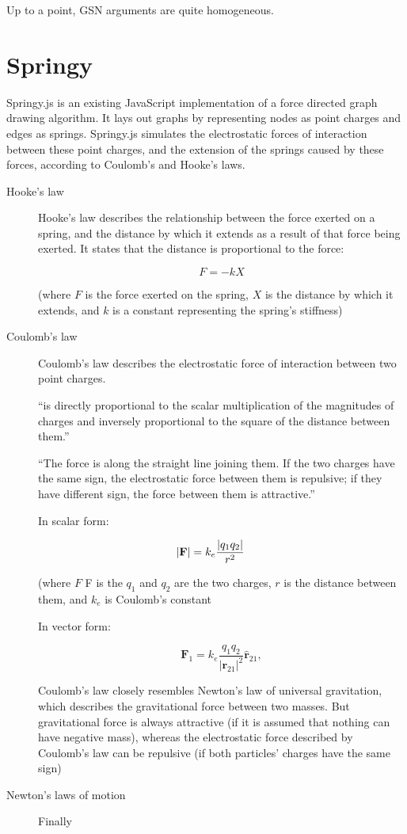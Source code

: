 Up to a point, GSN arguments are quite homogeneous. 


\section{Springy}

Springy.js is an existing JavaScript implementation of a force directed graph drawing algorithm.
It lays out graphs by representing nodes as point charges and edges as springs. Springy.js simulates the electrostatic forces of interaction between these point charges, and the extension of the springs caused by these forces, according to Coulomb's and Hooke's laws.



\begin{description}

\item[Hooke's law] Hooke's law describes the relationship between the force exerted on a spring,
    and the distance by which it extends as a result of that force being exerted.
    It states that the distance is proportional to the force:

    $$
    F = -kX
    $$

    (where $F$ is the force exerted on the spring,
    $X$ is the distance by which it extends,
    and $k$ is a constant representing the spring's stiffness)

\item[Coulomb's law] Coulomb's law describes the electrostatic force of interaction between two point charges.

    ``is directly proportional to the scalar multiplication of the magnitudes of charges and inversely proportional to the square of the distance between them.''

    ``The force is along the straight line joining them.
    If the two charges have the same sign,
    the electrostatic force between them is repulsive;
    if they have different sign,
    the force between them is attractive.'' 

    In scalar form:

    $$
    |\mathbf F|=k_e{|q_1q_2|\over r^2}\qquad
    $$

    (where $F$ F is the $q_1$ and $q_2$ are the two charges, $r$ is the distance between them, and $k_e$ is Coulomb's constant 

    In vector form:

    $$
    \qquad\mathbf F_1=k_e\frac{q_1q_2}{{|\mathbf r_{21}|}^2} \mathbf{\hat{r}}_{21},\qquad
    $$

    Coulomb's law closely resembles Newton's law of universal gravitation, which describes the gravitational force between two masses.
    But gravitational force is always attractive (if it is assumed that nothing can have negative mass),
    whereas the electrostatic force described by Coulomb's law can be repulsive (if both particles' charges have the same sign)

\item[Newton's laws of motion] Finally

\end{description}

